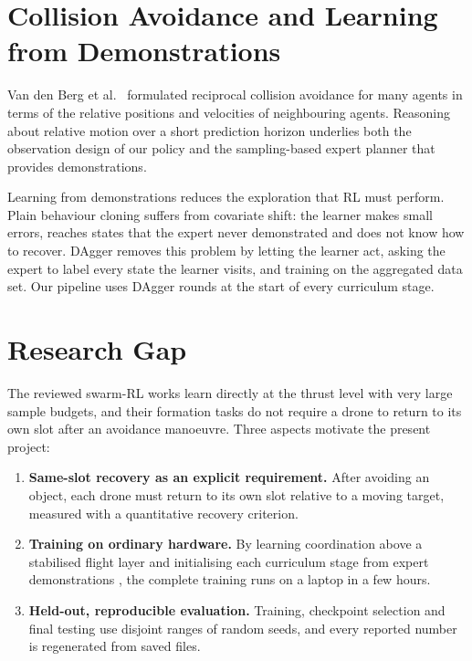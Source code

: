 \section{Collision Avoidance and Learning from Demonstrations}
Van den Berg et al.\ \cite{vandenberg2011reciprocal} formulated reciprocal collision avoidance for many agents in
terms of the relative positions and velocities of neighbouring agents. Reasoning about relative motion over a
short prediction horizon underlies both the observation design of our policy and the sampling-based expert
planner that provides demonstrations.

Learning from demonstrations reduces the exploration that RL must perform. Plain behaviour cloning suffers from
covariate shift: the learner makes small errors, reaches states that the expert never demonstrated and does not
know how to recover. DAgger \cite{ross2011reduction} removes this problem by letting the learner act, asking the
expert to label every state the learner visits, and training on the aggregated data set. Our pipeline uses DAgger
rounds at the start of every curriculum stage.

\section{Research Gap}
The reviewed swarm-RL works \cite{batra2021decentralized,huang2024collision} learn directly at the thrust level
with very large sample budgets, and their formation tasks do not require a drone to return to its own slot after
an avoidance manoeuvre. Three aspects motivate the present project:
\begin{enumerate}
  \item \textbf{Same-slot recovery as an explicit requirement.} After avoiding an object, each drone must return
        to its own slot relative to a moving target, measured with a quantitative recovery criterion.
  \item \textbf{Training on ordinary hardware.} By learning coordination above a stabilised flight layer
        \cite{panerati2021learning} and initialising each curriculum stage from expert demonstrations
        \cite{ross2011reduction}, the complete training runs on a laptop in a few hours.
  \item \textbf{Held-out, reproducible evaluation.} Training, checkpoint selection and final testing use disjoint
        ranges of random seeds, and every reported number is regenerated from saved files.
\end{enumerate}
